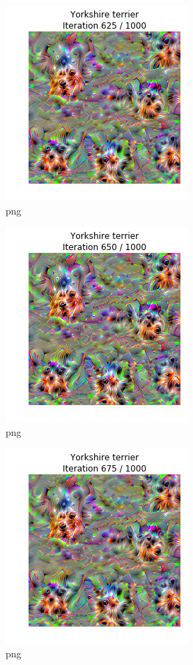 \documentclass[]{book}
\theoremstyle{definition}
\theoremstyle{definition}
\theoremstyle{definition}
\theoremstyle{remark}
\begin{document}
\begin{figure}
\centering
\includegraphics{Network-Visualization-TensorFlow_files/Network-Visualization-TensorFlow_24_26.png}
\caption{png}
\end{figure}

\begin{figure}
\centering
\includegraphics{Network-Visualization-TensorFlow_files/Network-Visualization-TensorFlow_24_27.png}
\caption{png}
\end{figure}

\begin{figure}
\centering
\includegraphics{Network-Visualization-TensorFlow_files/Network-Visualization-TensorFlow_24_28.png}
\caption{png}
\end{figure}
\end{document}
